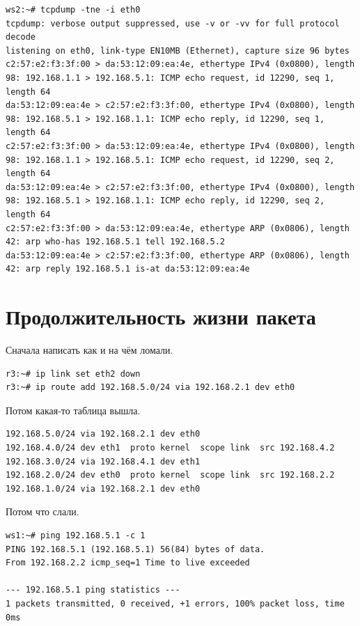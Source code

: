 \documentclass[a4paper,12pt]{article}
\begin{document}
\begin{Verbatim}
ws2:~# tcpdump -tne -i eth0
tcpdump: verbose output suppressed, use -v or -vv for full protocol decode
listening on eth0, link-type EN10MB (Ethernet), capture size 96 bytes
c2:57:e2:f3:3f:00 > da:53:12:09:ea:4e, ethertype IPv4 (0x0800), length 98: 192.168.1.1 > 192.168.5.1: ICMP echo request, id 12290, seq 1, length 64
da:53:12:09:ea:4e > c2:57:e2:f3:3f:00, ethertype IPv4 (0x0800), length 98: 192.168.5.1 > 192.168.1.1: ICMP echo reply, id 12290, seq 1, length 64
c2:57:e2:f3:3f:00 > da:53:12:09:ea:4e, ethertype IPv4 (0x0800), length 98: 192.168.1.1 > 192.168.5.1: ICMP echo request, id 12290, seq 2, length 64
da:53:12:09:ea:4e > c2:57:e2:f3:3f:00, ethertype IPv4 (0x0800), length 98: 192.168.5.1 > 192.168.1.1: ICMP echo reply, id 12290, seq 2, length 64
c2:57:e2:f3:3f:00 > da:53:12:09:ea:4e, ethertype ARP (0x0806), length 42: arp who-has 192.168.5.1 tell 192.168.5.2
da:53:12:09:ea:4e > c2:57:e2:f3:3f:00, ethertype ARP (0x0806), length 42: arp reply 192.168.5.1 is-at da:53:12:09:ea:4e
\end{Verbatim}


\section{Продолжительность жизни пакета}

Сначала написать как и на чём ломали. 

\begin{Verbatim}
r3:~# ip link set eth2 down
r3:~# ip route add 192.168.5.0/24 via 192.168.2.1 dev eth0
\end{Verbatim}

Потом какая-то таблица вышла.

\begin{Verbatim}
192.168.5.0/24 via 192.168.2.1 dev eth0 
192.168.4.0/24 dev eth1  proto kernel  scope link  src 192.168.4.2 
192.168.3.0/24 via 192.168.4.1 dev eth1 
192.168.2.0/24 dev eth0  proto kernel  scope link  src 192.168.2.2 
192.168.1.0/24 via 192.168.2.1 dev eth0 
\end{Verbatim}

Потом что слали.

\begin{Verbatim}
ws1:~# ping 192.168.5.1 -c 1
PING 192.168.5.1 (192.168.5.1) 56(84) bytes of data.
From 192.168.2.2 icmp_seq=1 Time to live exceeded

--- 192.168.5.1 ping statistics ---
1 packets transmitted, 0 received, +1 errors, 100% packet loss, time 0ms
\end{Verbatim}
\end{document}
